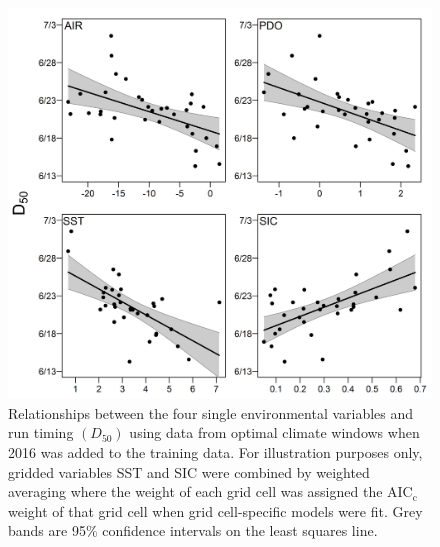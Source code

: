 \documentclass[12pt,]{book}
\theoremstyle{definition}
\theoremstyle{definition}
\theoremstyle{definition}
\theoremstyle{remark}
\begin{document}
\pagebreak

\begin{figure}
  \centering
  \includegraphics{img/Ch2/relationships.png}
  \caption{Relationships between the four single environmental variables and run timing $\left(D_{50}\right)$ using data from optimal climate windows when 2016 was added to the training data. For illustration purposes only, gridded variables SST and SIC were combined by weighted averaging where the weight of each grid cell was assigned the $\text{AIC}_{\text{c}}$ weight of that grid cell when grid cell-specific models were fit. Grey bands are 95$\%$ confidence intervals on the least squares line.}
  \label{fig:relationships}
\end{figure}

\pagebreak
\end{document}
